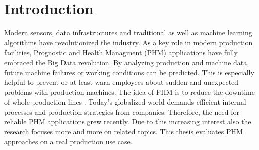 
\chapter{Introduction}\label{chapter:introduction}
Modern sensors, data infrastructures and traditional as well as machine learning algorithms have revolutionized the industry. As a key role in modern production facilities, Prognostic and Health Managment (PHM) applications have fully embraced the Big Data revolution. By analyzing production and machine data, future machine failures or working conditions can be predicted. This is especially helpful to prevent or at least warn employees about sudden and unexpected problems with production machines. The idea of PHM is to reduce the downtime of whole production lines \cite{ZHAO2019213}. Today's globalized world demands efficient internal processes and production strategies from companies. Therefore, the need for reliable PHM applications grew recently. Due to this increasing interest also the research focuses more and more on related topics. This thesis evaluates PHM approaches on a real production use case.

